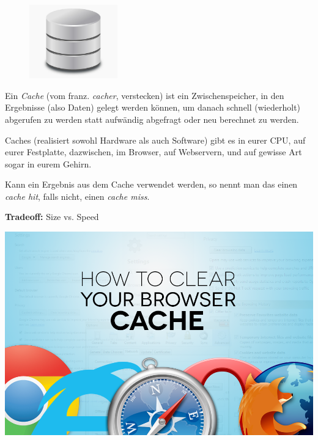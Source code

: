 \documentclass{beamer}
\begin{document}
\begin{frame}

\begin{figure}
\vspace{-25pt}
 \begin{center}
   \includegraphics[width=0.34\textwidth]{ce_cache__full.jpg}
 \end{center}
 \vspace{-30pt}
 \end{figure}

Ein \emph{Cache} (vom franz. \emph{cacher}, verstecken) ist ein Zwischenspeicher, in den Ergebnisse (also Daten) gelegt werden können, um danach schnell (wiederholt) abgerufen zu werden statt aufwändig abgefragt oder neu berechnet zu werden.
\pause
\bigskip

Caches (realisiert sowohl Hardware als auch Software) gibt es in eurer CPU, auf eurer Festplatte, dazwischen, im Browser, auf Webservern, und auf gewisse Art sogar in eurem Gehirn.
\pause
\bigskip

Kann ein Ergebnis aus dem Cache verwendet werden, so nennt man das einen \emph{cache hit}, falls nicht, einen \emph{cache miss}.
\end{frame}


\begin{frame}

\textbf{Tradeoff:} Size vs. Speed
\bigskip

\begin{center}
\includegraphics[scale=0.25]{browsercache.png} 
\end{center}

\end{frame}
\end{document}
